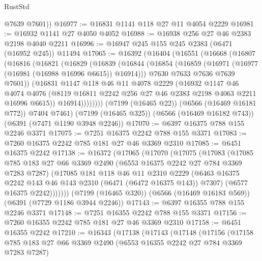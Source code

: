 \begin{lexlean}{RustStd}
\begin{coremodule}
        @7639
        @7601))
@16977 := @16831 @1141 @118 @27 @11 @4054 @2229
@16981 := @16932 @1141 @27 @4050 @4052
@16988 := @16938 @256 @27 @46 @2383 @2198 @4040 @2211
@16996 := @16947 @245 @155 @245 @2383 (@6471 (@16952 @245)) @11494
@17065 := @16392
    (@16404
      (@16551
        (@16668
          (@16807
            (@16816
              (@16821
                (@16829
                  (@16839
                    (@16844
                      (@16854
                        (@16859 (@16971 (@16977 (@16981 (@16988 @16996 @6615)) @16914)))
                        @7630
                        @7633
                        @7636
                        @7639
                        @7601))
                    (@16831
                      @1147
                      @118
                      @46
                      @11
                      @4078
                      @2229
                      (@16932
                        @1147
                        @46
                        @4074
                        @4076
                        (@8119 @16811 @2242 @256 @27 @46 @2383 @2198 @4063 @2211 @16996 @6615))
                      @16914))))))))
      (@7199 (@16465 @22))
      (@6566 (@16469 @16181 @772))
      @7404
      @7461)
    (@7199 (@16465 @325))
    (@6566 (@16469 @16182 @743))
    (@6391 (@7471 @1190 @3948 @2246))
@17070 := @6397 @16375 @788 @155 @2246 @3371
@17075 := @7251 @16375 @2242 @788 @155 @3371
@17083 := @7260 @16375 @2242 @785 @181 @27 @46 @3369 @2310
@17085 := @6451 @16375 @2242
@17138 := @16372
    (@17065
      (@17070
        (@17075
          (@17083
            (@17085
              @785
              @183
              @27
              @66
              @3369
              @2490
              (@6553 @16375 @2242 @27 @784 @3369 @7283 @7287)
              (@17085
                @181
                @118
                @46
                @11
                @2310
                @2229
                (@6463 @16375 @2242 @143 @46 @143 @2310 (@6471 (@6472 @16375 @143)) @7307)
                (@6577 @16375 @2242)))))))
    (@7199 (@16465 @320))
    (@6566 (@16469 @16183 @569))
    (@6391 (@7729 @1186 @3944 @2246))
@17143 := @6397 @16355 @788 @155 @2246 @3371
@17148 := @7251 @16355 @2242 @788 @155 @3371
@17156 := @7260 @16355 @2242 @785 @181 @27 @46 @3369 @2310
@17158 := @6451 @16355 @2242
@17210 := @16343
    (@17138
      (@17143
        (@17148
          (@17156
            (@17158
              @785
              @183
              @27
              @66
              @3369
              @2490
              (@6553 @16355 @2242 @27 @784 @3369 @7283 @7287)

\end{coremodule}
\end{lexlean}
